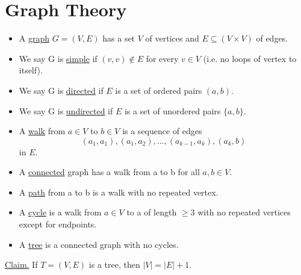 \documentclass[12pt]{amsart}
\begin{document}
\vspace{10mm}

\section{Graph Theory}

\begin{itemize}
\item{A \underline{graph} $G = (V,E)$ has a set $V$ of vertices and $E \subseteq (V \times V)$ of edges.}
\item{We say G is \underline{simple} if $(v,v) \notin E$ for every $v \in V$ (i.e. no loops of vertex to itself).}
\item{We say G is \underline{directed} if $E$ is a set of ordered pairs $(a,b)$.}
\item{We say G is \underline{undirected} if $E$ is a set of unordered pairs $\{a,b\}$.}
\item{A \underline{walk} from $a \in V$ to $b \in V$ is a sequence of edges
$$(a_1,a_1), (a_1,a_2),...,(a_{k-1},a_k),(a_k,b)$$
in $E$.}
\item{A \underline{connected} graph has a walk from a to b for all $a,b \in V$.}
\item{A \underline{path} from a to b is a walk with no repeated vertex.}
\item{A \underline{cycle} is a walk from $a \in V$ to a of length $\geq 3$ with no repeated vertices except for endpoints.}
\item{A \underline{tree} is a connected graph with no cycles.}
\end{itemize}

\vspace{10mm}

\underline{Claim.} If $T = (V,E)$ is a tree, then $|V| = |E| +1$. 
\end{document}
